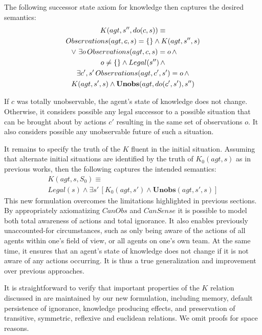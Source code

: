 \documentclass[letterpaper]{article}
\begin{document}
The following successor state axiom for knowledge then captures the
desired semantics: \begin{multline}
K(agt,s'',do(c,s))\equiv\\
Observations(agt,c,s)=\{\}\wedge K(agt,s'',s)\\
\shoveleft{\vee\,\,\exists o\, Observations(agt,c,s)=o\,\wedge}\\
o\neq\{\}\wedge Legal(s'')\,\wedge\\
\exists c',s'\, Observations(agt,c',s')=o\,\wedge\\
K(agt,s',s)\wedge\mathbf{Unobs}(agt,do(c',s'),s'')\label{eqn:new_k_ssa}\end{multline}


If $c$ was totally unobservable, the agent's state of knowledge does
not change. Otherwise, it considers possible any legal successor to
a possible situation that can be brought about by actions $c'$ resulting
in the same set of observations $o$. It also considers possible any
unobservable future of such a situation.

It remains to specify the truth of the $K$ fluent in the initial
situation. Assuming that alternate initial situations are identified
by the truth of $K_{0}(agt,s)$ as in previous works, then the following
captures the intended semantics:\begin{multline}
K(agt,s,S_{0})\equiv\\
Legal(s)\wedge\exists s'\,\left[K_{0}(agt,s')\wedge\mathbf{Unobs}(agt,s',s)\right]\label{eqn:new_k_s0}\end{multline}
This new formulation overcomes the limitations highlighted in previous
sections. By appropriately axiomatizing $CanObs$ and $CanSense$
it is possible to model both total awareness of actions and total
ignorance. It also enables previously unaccounted-for circumstances,
such as only being aware of the actions of all agents within one's
field of view, or all agents on one's own team. At the same time,
it ensures that an agent's state of knowledge does not change if it
is not aware of any actions occurring. It is thus a true generalization
and improvement over previous approaches.

It is straightforward to verify that important properties of the $K$
relation discussed in \cite{scherl03sc_knowledge} are maintained
by our new formulation, including memory, default persistence of ignorance,
knowledge producing effects, and preservation of transitive, symmetric,
reflexive and euclidean relations. We omit proofs for space reasons.
\end{document}
